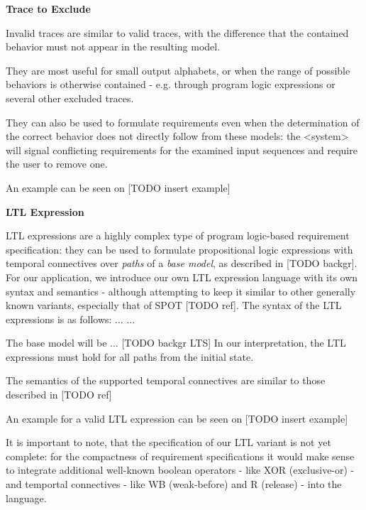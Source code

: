 \textbf{Trace to Exclude}

Invalid traces are similar to valid traces, with the difference that the contained behavior must not appear in the resulting model. 

They are most useful for small output alphabets, or when the range of possible behaviors is otherwise contained - e.g. through program logic expressions or several other excluded traces.

They can also be used to formulate requirements even when the determination of the correct behavior does not directly follow from these models: the <system> will signal conflicting requirements for the examined input sequences and require the user to remove one.

An example can be seen on [TODO insert example]

\textbf{LTL Expression}

LTL expressions are a highly complex type of program logic-based requirement specification: they can be used to formulate propositional logic expressions with temporal connectives over \textit{paths} of a \textit{base model}, as described in [TODO backgr]. For our application, we introduce our own LTL expression language with its own syntax and semantics - although attempting to keep it similar to other generally known variants, especially that of SPOT [TODO ref].
The syntax of the LTL expressions is as follows:
...
...

The base model will be ... [TODO backgr LTS]
In our interpretation, the LTL expressions must hold for all paths from the initial state.

The semantics of the supported temporal connectives are similar to those described in [TODO ref] %

An example for a valid LTL expression can be seen on [TODO insert example]

It is important to note, that the specification of our LTL variant is not yet complete: for the compactness of requirement specifications it would make sense to integrate additional well-known boolean operators - like XOR (exclusive-or) - and temportal connectives - like WB (weak-before) and R (release) - into the language. 

